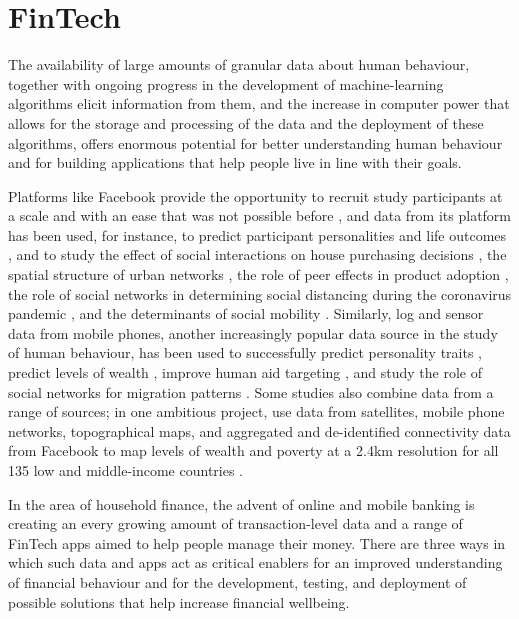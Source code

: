 \section{FinTech}%

The availability of large amounts of granular data about human behaviour,
together with ongoing progress in the development of machine-learning
algorithms elicit information from them, and the increase in computer power
that allows for the storage and processing of the data and the deployment of
these algorithms, offers enormous potential for better understanding human
behaviour \citep{jaffe2014big, buyalskaya2021golden} and for building
applications that help people live in line with their goals.

Platforms like Facebook provide the opportunity to recruit study participants
at a scale and with an ease that was not possible before
\citep{kosinski2015facebook}, and data from its platform has been used, for
instance, to predict participant personalities and life outcomes
\citep{youyou2015computer}, and to study the effect of social interactions on
house purchasing decisions \citep{bailey2018economic, bailey2019house}, the
spatial structure of urban networks \citep{bailey2020socialconnectedness}, the role of peer
effects in product adoption \citep{bailey2019peer}, the role of social networks
in determining social distancing during the coronavirus pandemic
\citep{bailey2020socialnetworks}, and the determinants of social mobility
\citep{chetty2022sociali, chetty2022socialii}. Similarly, log and sensor data
from mobile phones, another increasingly popular data source in the study of
human behaviour, has been used to successfully predict personality traits
\citep{montjoye2013predicting, stachl2020predicting}, predict levels of wealth
\citep{blumenstock2015predicting}, improve human aid targeting
\citep{aiken2022machine}, and study the role of social networks for migration
patterns \citep{blumenstock2019migration}. Some studies also combine data from
a range of sources; in one ambitious project, \citet{chi2022microestimates} use
data from satellites, mobile phone networks, topographical maps, and aggregated
and de-identified connectivity data from Facebook to map levels of wealth and
poverty at a 2.4km resolution for all 135 low and middle-income countries
\citep{chi2022microestimates}.

In the area of household finance, the advent of online and mobile banking is
creating an every growing amount of transaction-level data and a range of
FinTech apps aimed to help people manage their money. There are three ways in
which such data and apps act as critical enablers for an improved understanding
of financial behaviour and for the development, testing, and deployment of
possible solutions that help increase financial wellbeing.

